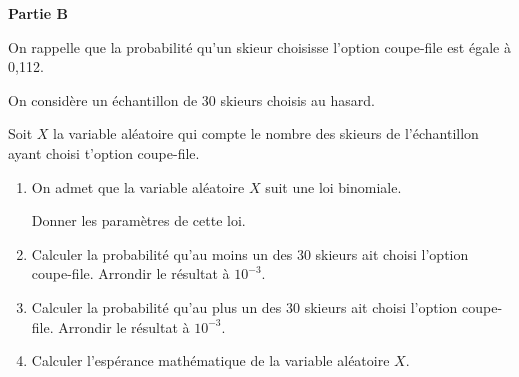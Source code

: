 \bigskip

\textbf{Partie B}

\medskip

On rappelle que la probabilité qu'un skieur choisisse l'option coupe-file est égale à 0,112.

On considère un échantillon de $30$ skieurs choisis au hasard.

Soit $X$ la variable aléatoire qui compte le nombre des skieurs de l'échantillon ayant
choisi t'option coupe-file.

\medskip

\begin{enumerate}
\item On admet que la variable aléatoire $X$ suit une loi binomiale. 

Donner les paramètres de cette loi.
\item Calculer la probabilité qu'au moins un des $30$ skieurs ait choisi l'option coupe-file. Arrondir le résultat à $10^{-3}$.
\item Calculer la probabilité qu'au plus un des $30$ skieurs ait choisi l'option coupe-file. Arrondir le résultat à $10^{-3}$.
\item Calculer l'espérance mathématique de la variable aléatoire $X$.
\end{enumerate}

\bigskip
